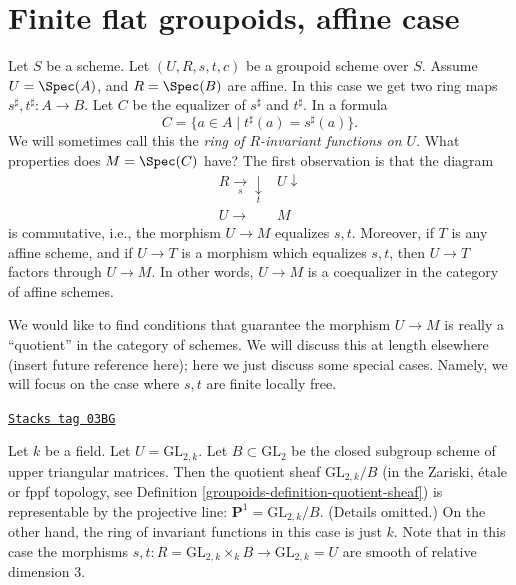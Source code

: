 \section{Finite flat groupoids, affine case}
\label{groupoids-section-finite-flat}
Let $S$ be a scheme.
Let $(U, R, s, t, c)$ be a groupoid scheme over $S$.
Assume $U = \Spec(A)$, and $R = \Spec(B)$ are affine.
In this case we get two ring maps
$s^\sharp, t^\sharp : A \longrightarrow B$.
Let $C$ be the equalizer of $s^\sharp$ and $t^\sharp$. In a formula
\begin{equation}
\label{equation-invariants}
C = \{a \in A \mid t^\sharp(a) = s^\sharp(a) \}.
\end{equation}
We will sometimes call this the {\it ring of $R$-invariant functions on $U$}.
What properties does $M = \Spec(C)$ have? The first observation is
that the diagram
$$
\begin{array}{cc}R \underset{s}{\longrightarrow}\underset{t}{\downarrow} & U \downarrow \\ U \longrightarrow & M\end{array}
$$
is commutative, i.e., the morphism $U \to M$ equalizes $s, t$.
Moreover, if $T$ is any affine scheme, and if $U \to T$ is
a morphism which equalizes $s, t$, then $U \to T$ factors through $U \to M$.
In other words, $U \to M$ is a coequalizer in the category of affine schemes.

\medskip\noindent
We would like to find conditions that guarantee the morphism $U \to M$ is
really a ``quotient'' in the category of schemes. We will discuss this at
length elsewhere (insert future reference here); here we just discuss some
special cases. Namely, we will focus on the case where $s, t$ are finite
locally free.

\begin{example}
\label{groupoids-example-quotient-projective-line}
\href{https://stacks.math.columbia.edu/tag/03BG}{\texttt{Stacks tag 03BG}}

Let $k$ be a field. Let $U = \text{GL}_{2, k}$. Let $B \subset \text{GL}_2$
be the closed subgroup scheme of upper triangular matrices.
Then the quotient sheaf $\text{GL}_{2, k}/B$ (in the Zariski, \'etale or
fppf topology, see Definition \ref{groupoids-definition-quotient-sheaf}) is
representable by the projective line: $\mathbf{P}^1 = \text{GL}_{2, k}/B$.
(Details omitted.)
On the other hand, the ring of invariant functions in this case is just $k$.
Note that in this case the morphisms
$s, t : R = \text{GL}_{2, k} \times_k B \to \text{GL}_{2, k} = U$ are smooth
of relative dimension $3$.
\end{example}

